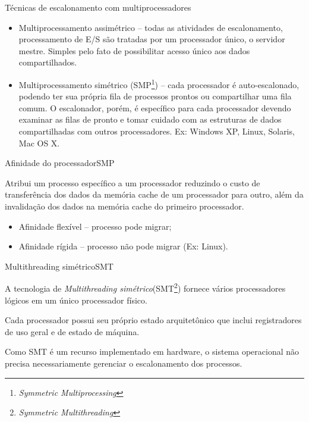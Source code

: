 \begin{frame}{Técnicas de escalonamento com multiprocessadores}

  \begin{itemize}
  \item \alert{Multiprocessamento assimétrico} -- todas as atividades de
    escalonamento, processamento de E/S são tratadas por um
    processador único, o servidor mestre. Simples pelo fato de
    possibilitar acesso único aos dados compartilhados.
    \pause
  \item \alert{Multiprocessamento simétrico} (SMP\footnote{{\em
        Symmetric Multiprocessing}}) -- cada processador é
    auto-escalonado, podendo ter sua própria fila de processos prontos
    ou compartilhar uma fila comum. O escalonador, porém, é específico
    para cada processador devendo examinar as filas de pronto e tomar
    cuidado com as estruturas de dados compartilhadas com outros
    processadores. Ex: Windows XP, Linux, Solaris, Mac OS X.
  \end{itemize}
  
\end{frame}


\begin{frame}{Afinidade do processador}{SMP}
  
  Atribui um processo específico a um processador reduzindo o custo de
  transferência dos dados da memória \alert{cache} de um processador
  para outro, além da invalidação dos dados na memória \alert{cache}
  do primeiro processador.

  \begin{itemize}
  \item \alert{Afinidade flexível} -- processo pode migrar;
  \item \alert{Afinidade rígida} -- processo não pode migrar (Ex: Linux).
  \end{itemize}

\end{frame}

\begin{frame}{Multithreading simétrico}{SMT}

A tecnologia de {\em Multithreading simétrico}(SMT\footnote{\em
Symmetric Multithreading}) fornece vários processadores lógicos em um
único processador físico.

Cada processador possui seu próprio \alert{estado arquitetônico} que inclui
registradores de uso geral e de estado de máquina.
  
Como SMT é um recurso implementado em hardware, o sistema operacional
não precisa \alert{necessariamente} gerenciar o escalonamento dos processos.

\end{frame}

